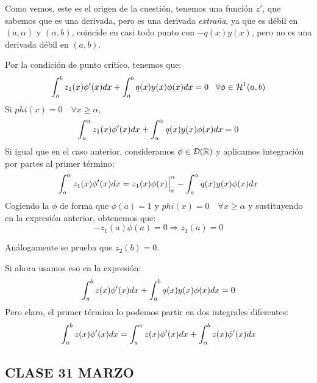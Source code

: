 Como vemos, este es el origen de la cuestión, tenemos una función $z'$, que sabemos que es una derivada, pero es una derivada \textit{extraña}, ya que es débil en $(a,\alpha)$ y $(\alpha,b)$, coincide en casi todo punto con $-q(x)y(x)$, pero no es una derivada débil en $(a,b)$. 

Por la condición de punto crítico, tenemos que:
\[
\displaystyle\int_{ a }^{ b } z_1(x)\phi'(x)dx+\displaystyle\int_{ a }^{ b } q(x)y(x)\phi(x)dx=0 \;\;\; \forall\phi\in\mathcal{H}^1(a,b)
\]
Si $phi(x)=0\quad\forall x\geq\alpha$,
\[
\displaystyle\int_{ a }^{ \alpha } z_1(x)\phi'(x)dx+\displaystyle\int_{ a }^{ \alpha } q(x)y(x)\phi(x)dx=0
\] 
Si igual que en el caso anterior, consideramos $\phi\in\mathcal{D}(\mathbb{R})$ y aplicamos integración por partes al primer término:
\[
\displaystyle\int_{ a }^{ \alpha } z_1(x)\phi'(x)dx=z_1(x)\phi(x)\Big|_a^\alpha-\displaystyle\int_{ a }^{ \alpha } q(x)y(x)\phi(x)dx
\]
Cogiendo la $\phi$ de forma que $\phi(a)=1$ y $phi(x)=0\quad\forall x\geq\alpha$ y sustituyendo en la expresión anterior, obtenemos que:
\[
-z_1(a)\phi(a)=0 \Rightarrow z_1(a)=0
\]

Análogamente se prueba que $z_2(b)=0$.

Si ahora usamos eso en la expresión:
\[
\displaystyle\int_{ a }^{ b } z(x)\phi'(x)dx+\displaystyle\int_{ a }^{ b } q(x)y(x)\phi(x)dx=0
\]
Pero claro, el primer término lo podemos partir en dos integrales diferentes:
\[
\displaystyle\int_{ a }^{ b } z(x)\phi'(x)dx=\displaystyle\int_{ a }^{ \alpha } z(x)\phi'(x)dx+\displaystyle\int_{ \alpha }^{ b } z(x)\phi'(x)dx
\]

\subsection{CLASE 31 MARZO}

